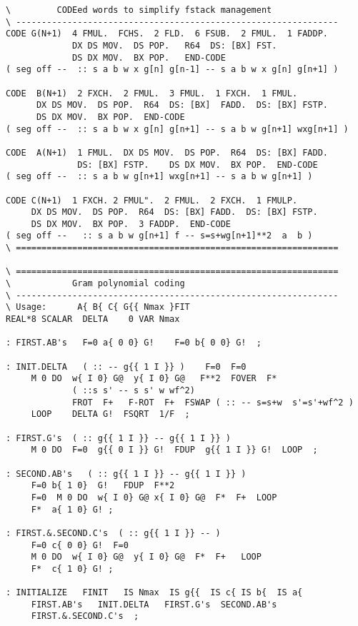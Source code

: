 \begin{lstlisting}
\         CODEed words to simplify fstack management
\ ---------------------------------------------------------------
CODE G(N+1)  4 FMUL.  FCHS.  2 FLD.  6 FSUB.  2 FMUL.  1 FADDP.
             DX DS MOV.  DS POP.   R64  DS: [BX] FST.
             DS DX MOV.  BX POP.   END-CODE
( seg off --  :: s a b w x g[n] g[n-1] -- s a b w x g[n] g[n+1] )

CODE  B(N+1)  2 FXCH.  2 FMUL.  3 FMUL.  1 FXCH.  1 FMUL.
      DX DS MOV.  DS POP.  R64  DS: [BX]  FADD.  DS: [BX] FSTP.
      DS DX MOV.  BX POP.  END-CODE
( seg off --  :: s a b w x g[n] g[n+1] -- s a b w g[n+1] wxg[n+1] )

CODE  A(N+1)  1 FMUL.  DX DS MOV.  DS POP.  R64  DS: [BX] FADD.
              DS: [BX] FSTP.    DS DX MOV.  BX POP.  END-CODE
( seg off --  :: s a b w g[n+1] wxg[n+1] -- s a b w g[n+1] )

CODE C(N+1)  1 FXCH. 2 FMUL".  2 FMUL.  2 FXCH.  1 FMULP.
     DX DS MOV.  DS POP.  R64  DS: [BX] FADD.  DS: [BX] FSTP.
     DS DX MOV.  BX POP.  3 FADDP.  END-CODE
( seg off --   :: s a b w g[n+1] f -- s=s+wg[n+1]**2  a  b )
\ ===============================================================

\ ===============================================================
\            Gram polynomial coding
\ ---------------------------------------------------------------
\ Usage:      A{ B{ C{ G{{ Nmax }FIT
REAL*8 SCALAR  DELTA    0 VAR Nmax

: FIRST.AB's   F=0 a{ 0 0} G!    F=0 b{ 0 0} G!  ;

: INIT.DELTA   ( :: -- g{{ 1 I }} )    F=0  F=0
     M 0 DO  w{ I 0} G@  y{ I 0} G@   F**2  FOVER  F* 
             ( ::s s' -- s s' w wf^2)
             FROT  F+   F-ROT  F+  FSWAP ( :: -- s=s+w  s'=s'+wf^2 )
     LOOP    DELTA G!  FSQRT  1/F  ;

: FIRST.G's  ( :: g{{ 1 I }} -- g{{ 1 I }} ) 
     M 0 DO  F=0  g{{ 0 I }} G!  FDUP  g{{ 1 I }} G!  LOOP  ;

: SECOND.AB's   ( :: g{{ 1 I }} -- g{{ 1 I }} )
     F=0 b{ 1 0}  G!   FDUP  F**2
     F=0  M 0 DO  w{ I 0} G@ x{ I 0} G@  F*  F+  LOOP  
     F*  a{ 1 0} G! ;

: FIRST.&.SECOND.C's  ( :: g{{ 1 I }} -- )
     F=0 c{ 0 0} G!  F=0
     M 0 DO  w{ I 0} G@  y{ I 0} G@  F*  F+   LOOP
     F*  c{ 1 0} G! ;

: INITIALIZE   FINIT   IS Nmax  IS g{{  IS c{ IS b{  IS a{
     FIRST.AB's   INIT.DELTA   FIRST.G's  SECOND.AB's
     FIRST.&.SECOND.C's  ;


\end{lstlisting}
